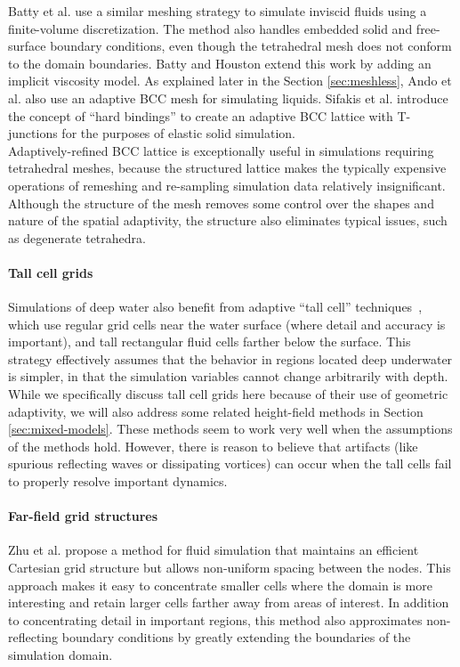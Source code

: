 Batty et al. \cite{Batty2010} use a similar meshing strategy to simulate inviscid fluids using a finite-volume discretization. The method also handles embedded solid and free-surface boundary conditions, even though the tetrahedral mesh does not conform to the domain boundaries. Batty and Houston \cite{Batty2011} extend this work by adding an implicit viscosity model. As explained later in the Section \ref{sec:meshless}, Ando et al. \cite{Ando2013} also use an adaptive BCC mesh for simulating liquids. Sifakis et al. \cite{Sifakis2007:Hybrid} introduce the concept of ``hard bindings'' to create an adaptive BCC lattice with T-junctions for the purposes of elastic solid simulation.
\\
Adaptively-refined BCC lattice is exceptionally useful in simulations requiring tetrahedral meshes, because the structured lattice makes the typically expensive operations of remeshing and re-sampling simulation data relatively insignificant. Although the structure of the mesh removes some control over the shapes and nature of the spatial adaptivity, the structure also eliminates typical issues, such as degenerate tetrahedra.

\paragraph*{Tall cell grids} Simulations of deep water also benefit from adaptive ``tall cell'' techniques~\cite{Irving2006,Chentanez2011}, which use regular grid cells near the water surface (where detail and accuracy is important), and tall rectangular fluid cells farther below the surface. This strategy effectively assumes that the behavior in regions located deep underwater is simpler, in that the simulation variables cannot change arbitrarily with depth. While we specifically discuss tall cell grids here because of their use of geometric adaptivity, we will also address some related height-field methods in Section \ref{sec:mixed-models}. These methods seem to work very well when the assumptions of the methods hold. However, there is reason to believe that artifacts (like spurious reflecting waves or dissipating vortices) can occur when the tall cells fail to properly resolve important dynamics.

\paragraph*{Far-field grid structures} Zhu et al. \cite{Zhu2013} propose a method for fluid simulation that maintains an efficient Cartesian grid structure but allows non-uniform spacing between the nodes.
This approach makes it easy to concentrate smaller cells where the domain is more interesting and retain larger cells farther away from areas of interest.
In addition to concentrating detail in important regions, this method also approximates non-reflecting boundary conditions by greatly extending the boundaries of the simulation domain.

